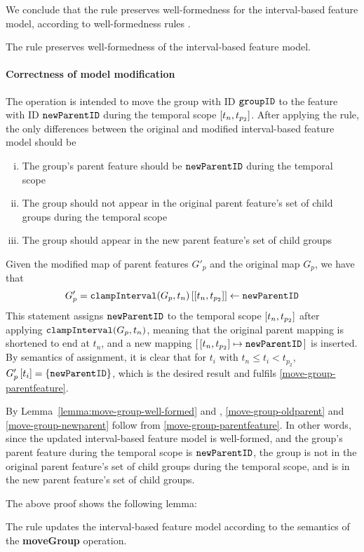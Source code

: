 We conclude that the  rule preserves well-formedness for the interval-based feature model, according to well-formedness rules . 
\\

\begin{lemma}
   The  rule preserves well-formedness of the interval-based feature model. 
   \label{lemma:move-group-well-formed}
\end{lemma}

\paragraph{Correctness of model modification}
The operation is intended to move the group with ID $\texttt{groupID}$ to the feature with ID $\texttt{newParentID}$ during the temporal scope $\interval{t_n}{t_{p_2}}$. After applying the  rule, the only differences between the original and modified interval-based feature model should be
\begin{enumerate}[(i)]
   \item The group's parent feature should be $\texttt{newParentID}$ during the temporal scope \label{move-group-parentfeature}
   \item The group should not appear in the original parent feature's set of child groups during the temporal scope \label{move-group-oldparent}
   \item The group should appear in the new parent feature's set of child groups \label{move-group-newparent}
\end{enumerate}

Given the modified map of parent features $G'_p$ and the original map $G_p$, we have that
\[
   G'_p = \lookup{\var{clampInterval}(G_p, t_n)}{\interval{t_n}{t_{p_2}}} \assign \var{newParentID}
\]
This statement assigns $\texttt{newParentID}$ to the temporal scope $\interval{t_n}{t_{p_2}}$ after applying $\texttt{clampInterval}(G_p, t_n)$, meaning that the original parent mapping is shortened to end at $t_n$, and a new mapping $\intervalmapping{t_n}{t_{p_2}}{\var{newParentID}}$ is inserted. By semantics of assignment, it is clear that for $t_i$ with $t_n \leq t_i < t_{p_2}$, $G'_p \left[ t_i \right] = \left\{\texttt{newParentID}\right\}$, which is the desired result and fulfils \ref{move-group-parentfeature}.

By Lemma~\vref{lemma:move-group-well-formed} and , \ref{move-group-oldparent} and \ref{move-group-newparent} follow from \ref{move-group-parentfeature}. In other words, since the updated interval-based feature model is well-formed, and the group's parent feature during the temporal scope is $\texttt{newParentID}$, the group is not in the original parent feature's set of child groups during the temporal scope, and is in the new parent feature's set of child groups.

The above proof shows the following lemma:
\\

\begin{lemma}
   The  rule updates the interval-based feature model according to the semantics of the \textbf{moveGroup} operation.
   \label{lemma:move-group-mod}
\end{lemma}
